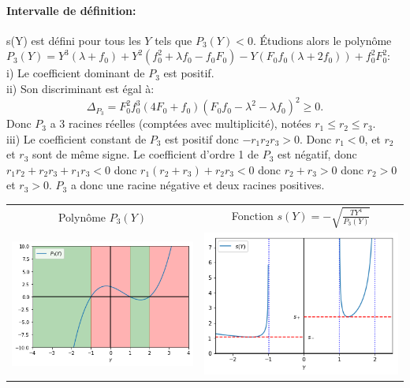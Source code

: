 \documentclass[11pt]{article}
\begin{document}
\paragraph{Intervalle de définition:}
s(Y) est défini pour tous les $Y$ tels que $P_3(Y)<0$. Étudions alors le polynôme $P_3(Y)=Y^3(\lambda + f_0)+ Y^2(f_0^2+ \lambda f_0 - f_0F_0)- Y(F_0f_0(\lambda+2f_0)) + f_0^2F_0^2$:\\
i) Le coefficient dominant de $P_3$ est positif.\\
ii) Son discriminant est égal à: \begin{equation}
	\Delta_{P_3}= F_{0}^{2} f_{0}^{3} (4 F_{0} + f_{0}) (F_{0} f_{0} -\lambda ^{2} - \lambda  f_{0})^{2} \geq 0.
\end{equation}
Donc $P_3$ a 3 racines réelles (comptées avec multiplicité), notées $r_1\leq r_2 \leq r_3$.\\
iii) Le coefficient constant de $P_3$ est positif donc $-r_1r_2r_3>0$. Donc $r_1<0$, et $r_2$ et $r_3$ sont de même signe. Le coefficient d'ordre 1 de $P_3$ est négatif, donc $r_1r_2 + r_2r_3 + r_1r_3<0$ donc $r_1(r_2+r_3)+r_2r_3<0$ donc $r_2+r_3>0$ donc $r_2>0$ et $r_3>0$. $P_3$ a donc une racine négative et deux racines positives.

\begin{tabular}{cc}
 Polynôme $P_3(Y)$ & Fonction $s(Y) = -\sqrt{\frac{TY^4}{P_3(Y)}}$ \\
\includegraphics[width=.47\textwidth]{Images/P3.png} & \includegraphics[width=.47\textwidth]{Images/s+s-.png} \\
\end{tabular}
\end{document}
